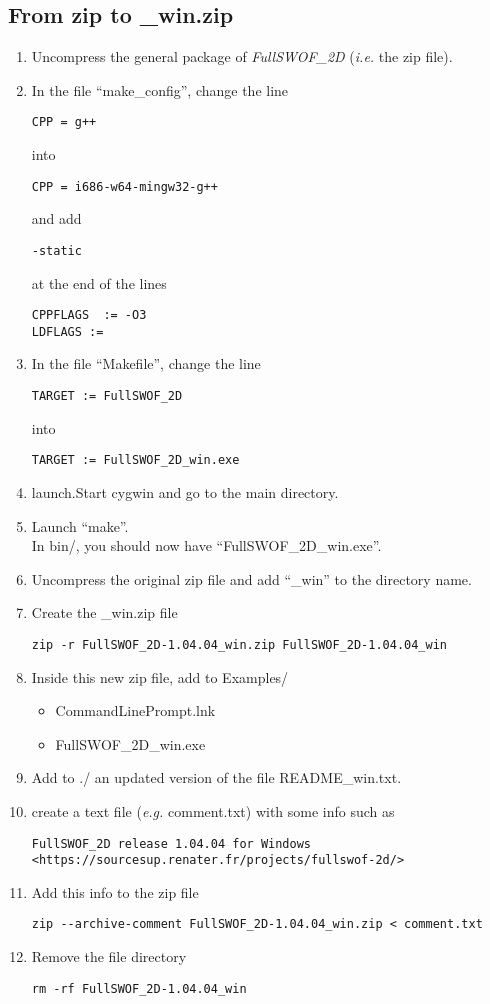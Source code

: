 \documentclass[a4paper, 11pt]{article}
\newcommand{\FullSWOFtwoD}{\emph{FullSWOF\_2D}}
\begin{document}
\subsection{From zip to \_win.zip}
\begin{enumerate}
\item Uncompress the general package of \FullSWOFtwoD{} (\emph{i.e.} the zip file).
\item In the file ``make\_config'', change the line
\begin{verbatim}
CPP = g++
\end{verbatim}
into
\begin{verbatim}
CPP = i686-w64-mingw32-g++
\end{verbatim}
and add
\begin{verbatim}
-static
\end{verbatim}
at the end of the lines
\begin{verbatim}
CPPFLAGS  := -O3
LDFLAGS :=
\end{verbatim}
\item In the file ``Makefile'', change the line
\begin{verbatim}
TARGET := FullSWOF_2D
\end{verbatim}
into
\begin{verbatim}
TARGET := FullSWOF_2D_win.exe
\end{verbatim}
\item launch.Start cygwin and go to the main directory.
\item Launch ``make''.\\
In bin/, you should now have ``FullSWOF\_2D\_win.exe''.
\item Uncompress the original zip file and add ``\_win'' to the directory name.
\item Create the \_win.zip file
\begin{verbatim}
zip -r FullSWOF_2D-1.04.04_win.zip FullSWOF_2D-1.04.04_win
\end{verbatim}
\item Inside this new zip file, add to Examples/
	\begin{itemize}
		\item CommandLinePrompt.lnk
		\item FullSWOF\_2D\_win.exe
	\end{itemize}
\item Add to ./ an updated version of the file README\_win.txt.
\item create a text file (\emph{e.g.} comment.txt) with some info such as
\begin{verbatim}
FullSWOF_2D release 1.04.04 for Windows
<https://sourcesup.renater.fr/projects/fullswof-2d/>
\end{verbatim}
\item Add this info to the zip file
\begin{verbatim}
zip --archive-comment FullSWOF_2D-1.04.04_win.zip < comment.txt
\end{verbatim}
\item Remove the file directory
\begin{verbatim}
rm -rf FullSWOF_2D-1.04.04_win
\end{verbatim}


\end{enumerate}
\end{document}
